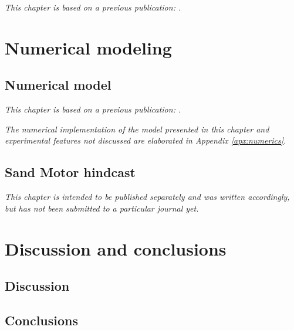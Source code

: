 \documentclass[twoside,openright,titlepage,
headinclude,footinclude,cleardoublepage=empty,
numbers=noenddot,fontsize=9pt]{scrbook}
\begin{document}
\emph{This chapter is based on a previous publication: .}



\cleardoublepage
{}
\part{Numerical modeling}

\chapter{Numerical model} \label{ch:model}

\emph{This chapter is based on a previous publication:
  .}

\bigskip

\noindent \emph{The numerical implementation of the model presented in
  this chapter and experimental features not discussed are elaborated
  in Appendix \ref{apx:numerics}.}



\chapter{Sand Motor hindcast} \label{ch:hindcast}

\emph{This chapter is intended to be published separately and was
  written accordingly, but has not been submitted to a particular
  journal yet.}



\cleardoublepage
\part{Discussion and conclusions}

\chapter{Discussion} \label{ch:discussion}



\chapter{Conclusions} \label{ch:conclusions}
\end{document}
